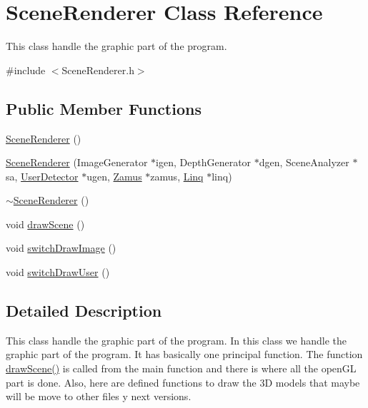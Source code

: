 \hypertarget{classSceneRenderer}{
\section{SceneRenderer Class Reference}
\label{classSceneRenderer}
}


This class handle the graphic part of the program.  




{\ttfamily \#include $<$SceneRenderer.h$>$}

\subsection*{Public Member Functions}
\begin{DoxyCompactItemize}
\item 
\hyperlink{classSceneRenderer_a925fa6a7da05d79bf80ea806912665a7}{SceneRenderer} ()
\item 
\hyperlink{classSceneRenderer_a0226fa3a32e9f5fcb1f155301713de85}{SceneRenderer} (ImageGenerator $\ast$igen, DepthGenerator $\ast$dgen, SceneAnalyzer $\ast$sa, \hyperlink{classUserDetector}{UserDetector} $\ast$ugen, \hyperlink{classZamus}{Zamus} $\ast$zamus, \hyperlink{classLinq}{Linq} $\ast$linq)
\item 
\hyperlink{classSceneRenderer_aceec75b5c04861c2a5c26349c2ba5748}{$\sim$SceneRenderer} ()
\item 
void \hyperlink{classSceneRenderer_ae6ca19a65696503e8dea028219fd3fba}{drawScene} ()
\item 
void \hyperlink{classSceneRenderer_ab104ce38576705968a1ced2cdd16b178}{switchDrawImage} ()
\item 
void \hyperlink{classSceneRenderer_a43045a5662099ef3064f902566875bcb}{switchDrawUser} ()
\end{DoxyCompactItemize}


\subsection{Detailed Description}
This class handle the graphic part of the program. In this class we handle the graphic part of the program. It has basically one principal function. The function \hyperlink{classSceneRenderer_ae6ca19a65696503e8dea028219fd3fba}{drawScene()} is called from the main function and there is where all the openGL part is done. Also, here are defined functions to draw the 3D models that maybe will be move to other files y next versions. 

